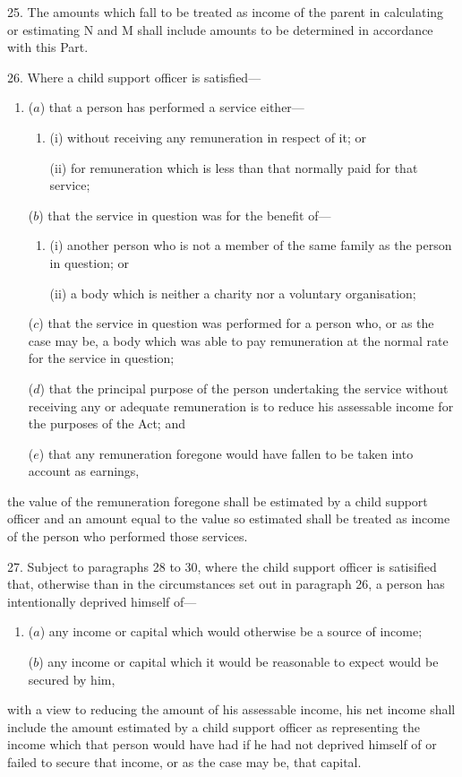 \documentclass[12pt,a4paper]{article}
\begin{document}
25.  The amounts which fall to be treated as income of the parent in calculating or estimating N and M shall include amounts to be determined in accordance with this Part.

\medskip

26.  Where a child support officer is satisfied—
\begin{enumerate}\item[]
($a$) that a person has performed a service either—
\begin{enumerate}\item[]
(i) without receiving any remuneration in respect of it; or

(ii) for remuneration which is less than that normally paid for that service;
\end{enumerate}

($b$) that the service in question was for the benefit of—
\begin{enumerate}\item[]
(i) another person who is not a member of the same family as the person in question; or

(ii) a body which is neither a charity nor a voluntary organisation;
\end{enumerate}

($c$) that the service in question was performed for a person who, or as the case may be, a body which was able to pay remuneration at the normal rate for the service in question;

($d$) that the principal purpose of the person undertaking the service without receiving any or adequate remuneration is to reduce his assessable income for the purposes of the Act; and

($e$) that any remuneration foregone would have fallen to be taken into account as earnings,
\end{enumerate}
the value of the remuneration foregone shall be estimated by a child support officer and an amount equal to the value so estimated shall be treated as income of the person who performed those services.

\medskip

27.  Subject to paragraphs 28 to 30, where the child support officer is satisified that, otherwise than in the circumstances set out in paragraph 26, a person has intentionally deprived himself of—
\begin{enumerate}\item[]
($a$) any income or capital which would otherwise be a source of income;

($b$) any income or capital which it would be reasonable to expect would be secured by him,
\end{enumerate}
with a view to reducing the amount of his assessable income, his net income shall include the amount estimated by a child support officer as representing the income which that person would have had if he had not deprived himself of or failed to secure that income, or as the case may be, that capital.
\end{document}
